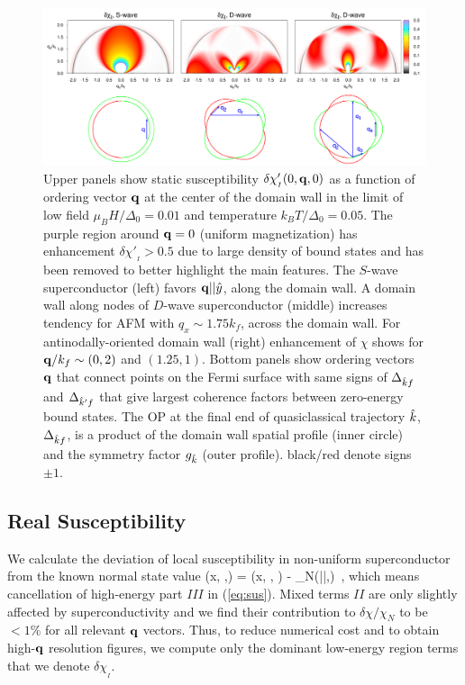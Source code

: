 \documentclass[prb,aps,showpacs,amsmath,twocolumn,10pt]{revtex4-1}
\begin{document}
\begin{figure}
\includegraphics[scale=0.14]{./Fig2}
\caption{\label{fig:2}
\quad Upper panels show static
susceptibility $\delta\chi'_{{}_I}(0,{\bf q},0)$ 
as a function of ordering vector ${\bf q}$ at the center of the domain wall in the limit of low field $\mu_B
H/\Delta_0=0.01$ and temperature $k_B T/\Delta_0=0.05$. 
The purple region around ${\bf q}=0$ (uniform magnetization) has enhancement $\delta\chi'_{{}_I}>0.5$ due to large density of 
bound states and has been removed to better highlight the main features. 
The $S$-wave superconductor (left) favors ${\bf q} || \hat{y}$, along the domain wall. A domain wall along nodes of $D$-wave superconductor (middle) increases tendency for AFM with $q_x \sim 1.75 k_f$, across the domain wall. For antinodally-oriented domain wall (right) enhancement of $\chi$ shows for ${\bf q}/k_f\sim (0,2)$ and $(1.25,1)$. 
Bottom panels show ordering vectors ${\bf q}$ that connect points on the Fermi surface with same signs of 
$\Delta_{\hat{k} f }$ and $\Delta_{\hat{k}' f }$ that give largest coherence factors between zero-energy bound states. 
The OP at the final end of quasiclassical trajectory $\hat{k}$, $\Delta_{\hat{k} f }$, 
is a product of the domain wall spatial profile (inner circle) 
and the symmetry factor $g_{\hat{k}}$ (outer profile). black/red denote signs $\pm1$. 
%
} 
\end{figure}

\subsection{Real Susceptibility}
\label{sec:realChi}
We calculate the deviation of local susceptibility in non-uniform superconductor from the known normal state value 
\be
\delta\chi(x, \vq,\omega) = \chi(x, \vq, \omega) - \chi_{N}(|\vq|,\omega) \,,
\ee
which means cancellation of high-energy part $III$ in (\ref{eq:sus}). 
Mixed terms $II$ are only slightly affected by superconductivity and we find their contribution to $\delta\chi/\chi_N$ to be $<1\%$ for all relevant ${\bf q}$ vectors. Thus, to reduce numerical cost and to obtain high-${\bf q}$ resolution figures, we compute only the dominant low-energy region terms that we denote $\delta\chi_{{}_I}$.
%
\end{document}
